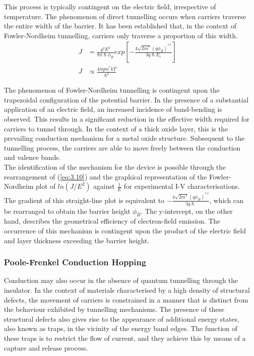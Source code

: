 \noindent This process is typically contingent on the electric field, irrespective of temperature. The phenomenon of direct tunnelling occurs when carriers traverse the entire width of the barrier. It has been established that, in the context of Fowler-Nordheim tunnelling, carriers only traverse a proportion of this width.
\begin{align}
    J &= \frac{q^2E^2}{8\pi\hslash\phi _B} exp \left[  -\frac{4\sqrt{2m^{*}}(q\phi _{B})^{^{3/2}}}{3q\hslash E_{i}} \right] \label{eq:3.10} \\
    J &\propto \frac{4\pi q m^* kT}{\hslash^3} \label{eq:3.11}
\end{align}

\noindent The phenomenon of Fowler-Nordheim tunnelling is contingent upon the trapezoidal configuration of the potential barrier. In the presence of a substantial application of an electric field, an increased incidence of band-bending is observed. This results in a significant reduction in the effective width required for carriers to tunnel through. In the context of a thick oxide layer, this is the prevailing conduction mechanism for a metal oxide structure. Subsequent to the tunnelling process, the carriers are able to move freely between the conduction and valence bands.\\

\noindent The identification of the mechanism for the device is possible through the rearrangement of (\ref{eq:3.10}) and the graphical representation of the Fowler-Nordheim plot of $ln(J/E^2)$ against $\frac{1}{E}$ for experimental I-V characterisations. The gradient of this straight-line plot is equivalent to $-\frac{4\sqrt{2m^{*}}(q\phi _{B})^{^{3/2}}}{3q\hslash}$, which can be rearranged to obtain the barrier height $\phi_B$. The y-intercept, on the other hand, describes the geometrical efficiency of electron-field emission. The occurrence of this mechanism is contingent upon the product of the electric field and layer thickness exceeding the barrier height.

\subsubsection[Poole-Frenkel Hopping]{Poole-Frenkel Conduction Hopping}

\noindent Conduction may also occur in the absence of quantum tunnelling through the insulator. In the context of materials characterised by a high density of structural defects, the movement of carriers is constrained in a manner that is distinct from the behaviour exhibited by tunnelling mechanisms. The presence of these structural defects also gives rise to the appearance of additional energy states, also known as traps, in the vicinity of the energy band edges. The function of these traps is to restrict the flow of current, and they achieve this by means of a capture and release process.\\

